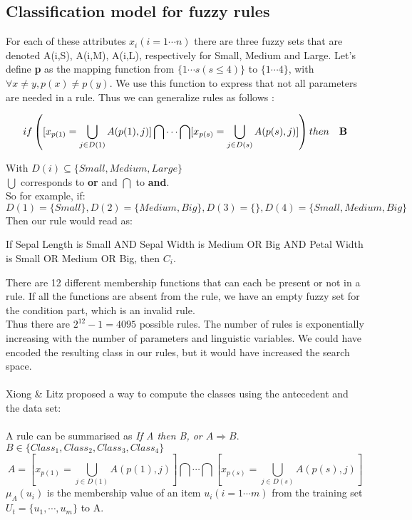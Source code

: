 \documentclass[a4paper,12pt]{article}
\begin{document}
\subsection{Classification model for fuzzy rules}
For each of these attributes $x_{i}(i=1\cdots n)$ there are three fuzzy sets that are denoted A(i,S), A(i,M), A(i,L), respectively for Small, Medium and Large.
Let's define \textbf{p} as the mapping function from $\{1\cdots s(s\leq4)\}$ to $\{1\cdots4\}$, with $\forall x\neq y, p(x)\neq p(y)$. We use this function to express that not all parameters are needed in a rule.
Thus we can generalize rules as follows :

\[if \left( [x_{p(1)}=\bigcup_{j\in D(1)}A(p(1),j) ] \bigcap\cdots\bigcap[x_{p(s)}=\bigcup_{j\in D(s)}A(p(s),j) ] \right) then\quad \bf B \] 

With $D(i)\subseteq\{Small,Medium,Large\}$ \\
$\bigcup$ corresponds to \textbf{or} and $\bigcap$ to \textbf{and}.\\
So for example, if:
\[D(1)=\{Small\},D(2)=\{Medium,Big\},D(3)=\{\},D(4)=\{Small,Medium,Big\}\]
Then our rule would read as:
\begin{center}If Sepal Length is Small AND Sepal Width is Medium OR Big AND Petal Width is Small OR Medium OR Big, then $C_i$.\end{center} 
There are 12 different membership functions that can each be present or not in a rule. If all the functions are absent from the rule, we have an empty fuzzy set for the condition part, which is an invalid rule.\\
Thus there are $2^{12}-1=4095$ possible rules. The number of rules is exponentially increasing with the number of parameters and linguistic variables. We could have encoded the resulting class in our rules, but it would have increased the search space. \\ 
\\
Xiong \& Litz proposed a way to compute the classes using the antecedent and the data set: \\
\\
A rule can be summarised as \textit{If A then B, or $A\Rightarrow B$}.\\
$B\in \{Class_1,Class_2,Class_3,Class_4\}$\\
\[A=[x_{p(1)}=\bigcup_{j\in D(1)}A(p(1),j) ] \bigcap\cdots\bigcap[x_{p(s)}=\bigcup_{j\in D(s)}A(p(s),j)]\]
$\mu_A(u_i)$ is the membership value of an item $u_i(i=1\cdots m)$ from the training set $U_t=\{u_1,\cdots ,u_m\}$ to A.
\end{document}
